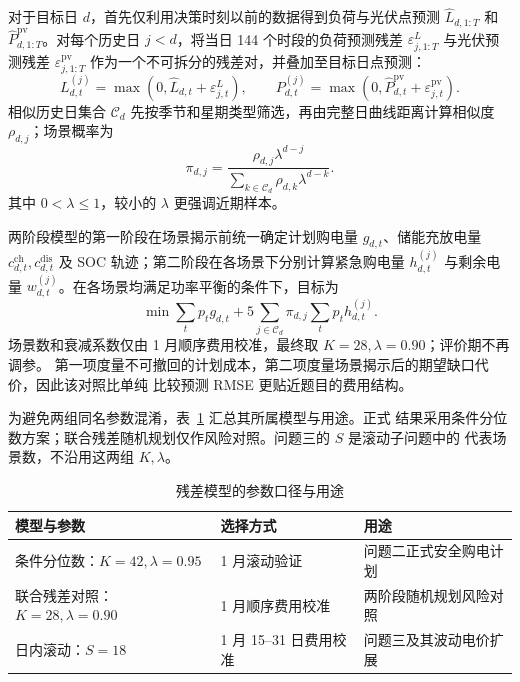 \documentclass[withoutpreface,bwprint]{cumcmthesis}
\begin{document}
对于目标日 $d$，首先仅利用决策时刻以前的数据得到负荷与光伏点预测
$\widehat L_{d,1:T}$ 和 $\widehat P^{\mathrm{pv}}_{d,1:T}$。对每个历史日 $j<d$，将当日
144 个时段的负荷预测残差 $\varepsilon^L_{j,1:T}$ 与光伏预测残差
$\varepsilon^{\mathrm{pv}}_{j,1:T}$ 作为一个不可拆分的残差对，并叠加至目标日点预测：
\begin{equation}
  L_{d,t}^{(j)}=\max(0,\widehat L_{d,t}+\varepsilon^L_{j,t}),\qquad
  P_{d,t}^{(j)}=\max(0,\widehat P^{\mathrm{pv}}_{d,t}
  +\varepsilon^{\mathrm{pv}}_{j,t}).
  \label{eq:q2-joint-scenario}
\end{equation}
相似历史日集合 $\mathcal C_d$ 先按季节和星期类型筛选，再由完整日曲线距离计算相似度
$\rho_{d,j}$；场景概率为
\begin{equation}
  \pi_{d,j}=\frac{\rho_{d,j}\lambda^{d-j}}
  {\sum_{k\in\mathcal C_d}\rho_{d,k}\lambda^{d-k}}.
  \label{eq:q2-scenario-weight}
\end{equation}
其中 $0<\lambda\leq1$，较小的 $\lambda$ 更强调近期样本。

两阶段模型的第一阶段在场景揭示前统一确定计划购电量 $g_{d,t}$、储能充放电量
$c_{d,t}^{\mathrm{ch}},c_{d,t}^{\mathrm{dis}}$ 及 SOC 轨迹；第二阶段在各场景下分别计算紧急购电量
$h_{d,t}^{(j)}$ 与剩余电量 $w_{d,t}^{(j)}$。在各场景均满足功率平衡的条件下，目标为
\begin{equation}
  \min\sum_t p_tg_{d,t}
  +5\sum_{j\in\mathcal C_d}\pi_{d,j}\sum_t p_th_{d,t}^{(j)}.
  \label{eq:q2-stochastic-objective}
\end{equation}
场景数和衰减系数仅由 1 月顺序费用校准，最终取 $K=28,\lambda=0.90$；评价期不再调参。
第一项度量不可撤回的计划成本，第二项度量场景揭示后的期望缺口代价，因此该对照比单纯
比较预测 RMSE 更贴近题目的费用结构。

为避免两组同名参数混淆，表~\ref{tab:model-parameter-map} 汇总其所属模型与用途。正式
结果采用条件分位数方案；联合残差随机规划仅作风险对照。问题三的 $S$ 是滚动子问题中的
代表场景数，不沿用这两组 $K,\lambda$。

\begin{table}[H]
  \centering
  \caption{残差模型的参数口径与用途}
  \label{tab:model-parameter-map}
  \small
  \begin{tabular}{lp{4.1cm}p{5.4cm}}
    \toprule
    模型与参数 & 选择方式 & 用途 \\
    \midrule
    条件分位数：$K=42,\lambda=0.95$ & 1 月滚动验证 & 问题二正式安全购电计划 \\
    联合残差对照：$K=28,\lambda=0.90$ & 1 月顺序费用校准 & 两阶段随机规划风险对照 \\
    日内滚动：$S=18$ & 1 月 15--31 日费用校准 & 问题三及其波动电价扩展 \\
    \bottomrule
  \end{tabular}
\end{table}
\end{document}
